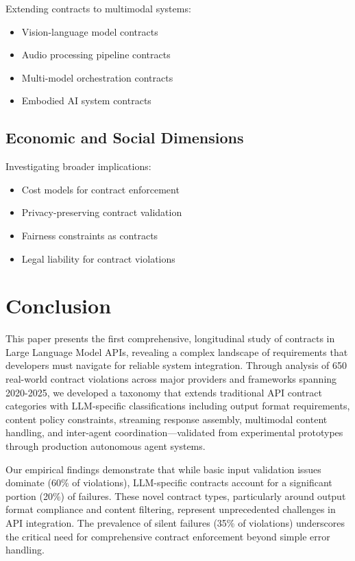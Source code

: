 \documentclass[11pt]{article}
\begin{document}
Extending contracts to multimodal systems:
\begin{itemize}
    \item Vision-language model contracts
    \item Audio processing pipeline contracts
    \item Multi-model orchestration contracts
    \item Embodied AI system contracts
\end{itemize}

\subsection{Economic and Social Dimensions}

Investigating broader implications:
\begin{itemize}
    \item Cost models for contract enforcement
    \item Privacy-preserving contract validation
    \item Fairness constraints as contracts
    \item Legal liability for contract violations
\end{itemize}

\section{Conclusion}
\label{sec:conclusion}

This paper presents the first comprehensive, longitudinal study of contracts in Large Language Model APIs, revealing a complex landscape of requirements that developers must navigate for reliable system integration. Through analysis of 650 real-world contract violations across major providers and frameworks spanning 2020-2025, we developed a taxonomy that extends traditional API contract categories with LLM-specific classifications including output format requirements, content policy constraints, streaming response assembly, multimodal content handling, and inter-agent coordination—validated from experimental prototypes through production autonomous agent systems.

Our empirical findings demonstrate that while basic input validation issues dominate (60\% of violations), LLM-specific contracts account for a significant portion (20\%) of failures. These novel contract types, particularly around output format compliance and content filtering, represent unprecedented challenges in API integration. The prevalence of silent failures (35\% of violations) underscores the critical need for comprehensive contract enforcement beyond simple error handling.
\end{document}
